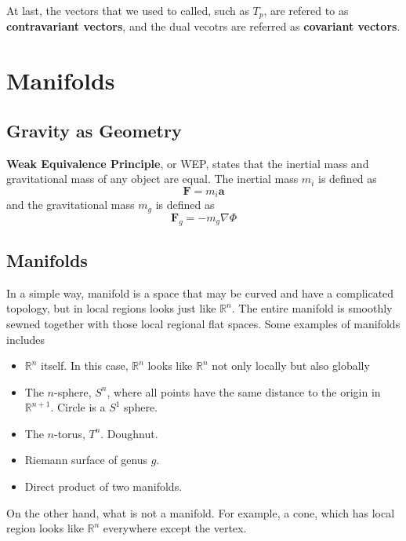 \documentclass[11pt]{article}
\theoremstyle{definition}
\numberwithin{equation}{section}
\begin{document}
At last, the vectors that we used to called, such as $T_p$, are refered to as \textbf{contravariant vectors}, and the dual vecotrs are referred as \textbf{covariant vectors}. 

\section{Manifolds}
\subsection{Gravity as Geometry}
\textbf{Weak Equivalence Principle}, or WEP, states that the inertial mass and gravitational mass of any object are equal. The inertial mass $m_i$ is defined as 
\begin{equation}
    \textbf{F} = m_i \textbf{a}
\end{equation}
and the gravitational mass $m_g$ is defined as 
\begin{equation}
    \textbf{F}_g = -m_g \nabla\Phi
\end{equation}

\subsection{Manifolds}
In a simple way, manifold is a space that may be curved and have a complicated topology, but in local regions looks just like $\mathbb{R}^n$. The entire manifold is smoothly sewned together with those local regional flat spaces. Some examples of manifolds includes
\begin{itemize}
    \item $\mathbb{R}^n$ itself. In this case, $\mathbb{R}^n$ looks like $\mathbb{R}^n$ not only locally but also globally
    \item The $n$-sphere, $S^n$, where all points have the same distance to the origin in $\mathbb{R}^{n+1}$. Circle is a $S^1$ sphere.
    \item The $n$-torus, $T^n$. Doughnut.
    \item Riemann surface of genus $g$.
    \item Direct product of two manifolds.
\end{itemize}

On the other hand, what is not a manifold. For example, a cone, which has local region looks like $\mathbb{R}^n$ everywhere except the vertex.
\end{document}
